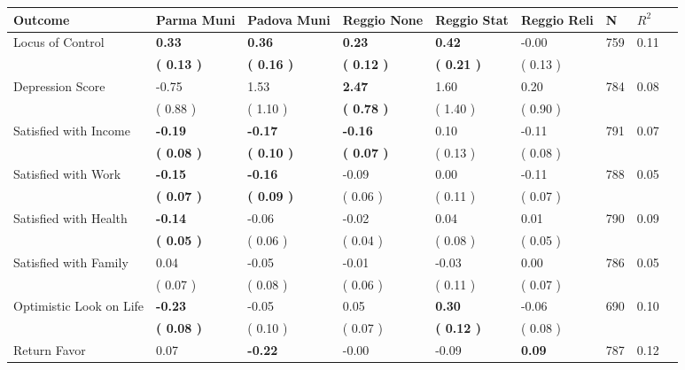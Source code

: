 \begin{tabular}{L{6.2cm} C{1.8cm} C{1.8cm} C{1.8cm} C{1.8cm} C{1.8cm} C{1.8cm} C{0.3cm} C{0.3cm}}
\toprule
 \textbf{Outcome} & \textbf{Parma Muni} & \textbf{Padova Muni} & \textbf{Reggio None} & \textbf{Reggio Stat} & \textbf{Reggio Reli} & \textbf{N} & \textbf{$ R^2$} \\
\midrule
Locus of Control & \textbf{     0.33} & \textbf{     0.36} & \textbf{     0.23} & \textbf{     0.42} &     -0.00  & 759 &       0.11 \\ 
 & \textbf{(     0.13 )} & \textbf{(     0.16 )} & \textbf{(     0.12 )} & \textbf{(     0.21 )} & (     0.13 )  & \\
Depression Score &     -0.75 &      1.53 & \textbf{     2.47} &      1.60 &      0.20  & 784 &       0.08 \\ 
 & (     0.88 ) & (     1.10 ) & \textbf{(     0.78 )} & (     1.40 ) & (     0.90 )  & \\
Satisfied with Income & \textbf{    -0.19} & \textbf{    -0.17} & \textbf{    -0.16} &      0.10 &     -0.11  & 791 &       0.07 \\ 
 & \textbf{(     0.08 )} & \textbf{(     0.10 )} & \textbf{(     0.07 )} & (     0.13 ) & (     0.08 )  & \\
Satisfied with Work & \textbf{    -0.15} & \textbf{    -0.16} &     -0.09 &      0.00 &     -0.11  & 788 &       0.05 \\ 
 & \textbf{(     0.07 )} & \textbf{(     0.09 )} & (     0.06 ) & (     0.11 ) & (     0.07 )  & \\
Satisfied with Health & \textbf{    -0.14} &     -0.06 &     -0.02 &      0.04 &      0.01  & 790 &       0.09 \\ 
 & \textbf{(     0.05 )} & (     0.06 ) & (     0.04 ) & (     0.08 ) & (     0.05 )  & \\
Satisfied with Family &      0.04 &     -0.05 &     -0.01 &     -0.03 &      0.00  & 786 &       0.05 \\ 
 & (     0.07 ) & (     0.08 ) & (     0.06 ) & (     0.11 ) & (     0.07 )  & \\
Optimistic Look on Life & \textbf{    -0.23} &     -0.05 &      0.05 & \textbf{     0.30} &     -0.06  & 690 &       0.10 \\ 
 & \textbf{(     0.08 )} & (     0.10 ) & (     0.07 ) & \textbf{(     0.12 )} & (     0.08 )  & \\
Return Favor &      0.07 & \textbf{    -0.22} &     -0.00 &     -0.09 & \textbf{     0.09}  & 787 &       0.12 \\ 

\end{tabular}
